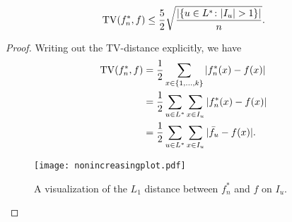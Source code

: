 \begin{prop}
  \[
    \operatorname{TV}(f^*_n, f) \le \frac{5}{2} \sqrt{\frac{|\{u \in L^* \colon |I_u| > 1\} |}{n}} .
  \]
\end{prop}
\begin{proof}
  Writing out the TV-distance explicitly, we have
  \begin{align*}
    \TV(f^*_n, f) &= \frac{1}{2} \sum_{x \in \{1, \dots, k\}} |f^*_n(x) - f(x)| \\
                  &= \frac{1}{2} \sum_{u \in L^*} \sum_{x \in I_u} |f^*_n(x) - f(x)| \\
                  &= \frac{1}{2} \sum_{u \in L^*} \sum_{x \in I_u} | \bar{f}_u - f(x) | .
  \end{align*}
  \begin{figure} 
    \centering
    \texttt{[image: nonincreasingplot.pdf]}
    \caption{A visualization of the $L_1$ distance between $f^*_n$ and
      $f$ on $I_u$.}
  \end{figure}
  

\end{proof}
